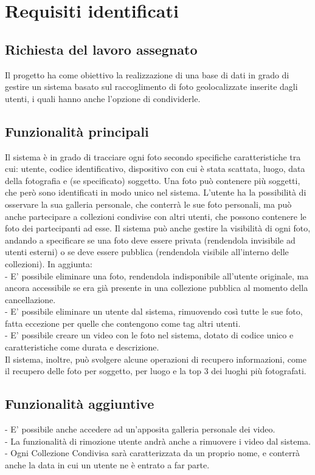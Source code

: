 \chapter{Requisiti identificati}

\section{Richiesta del lavoro assegnato}
Il progetto ha come obiettivo la realizzazione di una base di dati in grado di gestire un sistema basato sul raccoglimento di foto geolocalizzate inserite dagli utenti, i quali hanno anche l'opzione di condividerle. 

\section{Funzionalità principali}
Il sistema è in grado di tracciare ogni foto secondo specifiche caratteristiche tra cui: utente, codice identificativo, dispositivo con cui è stata scattata, luogo, data della fotografia e (se specificato) soggetto.
Una foto può contenere più soggetti, che però sono identificati in modo unico nel sistema.
L'utente ha la possibilità di osservare la sua galleria personale, che conterrà le sue foto personali, ma può anche partecipare a collezioni condivise con altri utenti, che possono contenere le foto dei partecipanti ad esse.
Il sistema può anche gestire la visibilità di ogni foto, andando a specificare se una foto deve essere privata (rendendola invisibile ad utenti esterni) o se deve essere pubblica (rendendola visibile all'interno delle collezioni).
\break
In aggiunta:
\break \\
 - E' possibile eliminare una foto, rendendola indisponibile all'utente originale, ma ancora accessibile se era già presente in una collezione pubblica al momento della cancellazione.
\break \\
- E' possibile eliminare un utente dal sistema, rimuovendo così tutte le sue foto, fatta eccezione per quelle che contengono come tag altri utenti.
\break \\
- E' possibile creare un video con le foto nel sistema, dotato di codice unico e caratteristiche come durata e descrizione.
\break \\
Il sistema, inoltre, può svolgere alcune operazioni di recupero informazioni, come il recupero delle foto per soggetto, per luogo e la top 3 dei luoghi più fotografati.

\section{Funzionalità aggiuntive}
\vspace{1em}
- E' possibile anche accedere ad un'apposita galleria personale dei video.
\break \\
- La funzionalità di rimozione utente andrà anche a rimuovere i video dal sistema.
\break \\
- Ogni Collezione Condivisa sarà caratterizzata da un proprio nome, e conterrà anche la data in cui un utente ne è entrato a far parte.
\break \\